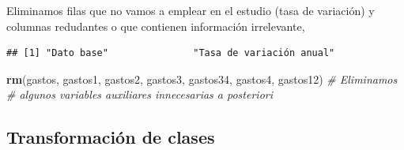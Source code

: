 \documentclass[data,article,submit,moreauthors,pdftex]{Definitions/mdpi}
\newenvironment{Shaded}{\begin{snugshade}}{\end{snugshade}}
\newcommand{\AttributeTok}[1]{\textcolor[rgb]{0.13,0.29,0.53}{#1}}
\newcommand{\CommentTok}[1]{\textcolor[rgb]{0.56,0.35,0.01}{\textit{#1}}}
\newcommand{\DecValTok}[1]{\textcolor[rgb]{0.00,0.00,0.81}{#1}}
\newcommand{\FunctionTok}[1]{\textcolor[rgb]{0.13,0.29,0.53}{\textbf{#1}}}
\newcommand{\NormalTok}[1]{#1}
\newcommand{\OtherTok}[1]{\textcolor[rgb]{0.56,0.35,0.01}{#1}}
\newcommand{\SpecialCharTok}[1]{\textcolor[rgb]{0.81,0.36,0.00}{\textbf{#1}}}
\newcommand{\StringTok}[1]{\textcolor[rgb]{0.31,0.60,0.02}{#1}}
\begin{document}
Eliminamos filas que no vamos a emplear en el estudio (tasa de
variación) y columnas redudantes o que contienen información
irrelevante,

\begin{Shaded}
\end{Shaded}

\begin{verbatim}
## [1] "Dato base"               "Tasa de variación anual"
\end{verbatim}

\begin{Shaded}
\end{Shaded}

\begin{Shaded}
\begin{Highlighting}[]
\FunctionTok{rm}\NormalTok{(gastos, gastos1, gastos2, gastos3, gastos34, gastos4, gastos12)  }\CommentTok{\# Eliminamos}
\CommentTok{\# algunos variables auxiliares innecesarias a posteriori}
\end{Highlighting}
\end{Shaded}

\subsection{Transformación de clases}\label{transformaciuxf3n-de-clases}
\end{document}
